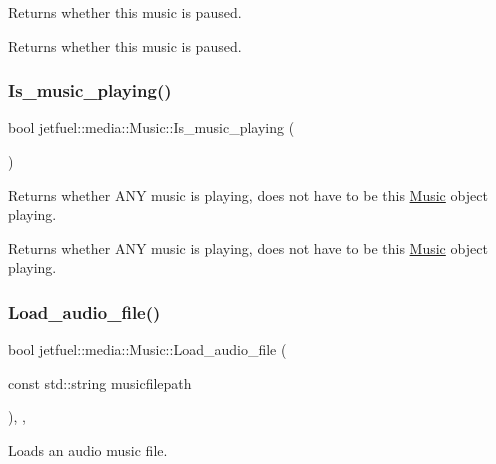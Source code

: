 Returns whether this music is paused. 

Returns whether this music is paused. \mbox{\label{classjetfuel_1_1media_1_1Music_ad19f7983782f39f70e354796c2ba0bd1}} 
\subsubsection{\texorpdfstring{Is\+\_\+music\+\_\+playing()}{Is\_music\_playing()}}
{\footnotesize\ttfamily bool jetfuel\+::media\+::\+Music\+::\+Is\+\_\+music\+\_\+playing (\begin{DoxyParamCaption}{ }\end{DoxyParamCaption})\hspace{0.3cm}{\ttfamily [inline]}}



Returns whether A\+NY music is playing, does not have to be this \hyperlink{classjetfuel_1_1media_1_1Music}{Music} object playing. 

Returns whether A\+NY music is playing, does not have to be this \hyperlink{classjetfuel_1_1media_1_1Music}{Music} object playing. \mbox{\label{classjetfuel_1_1media_1_1Music_ae24079b0301f5cf845d094e32ed22da1}} 
\subsubsection{\texorpdfstring{Load\+\_\+audio\+\_\+file()}{Load\_audio\_file()}}
{\footnotesize\ttfamily bool jetfuel\+::media\+::\+Music\+::\+Load\+\_\+audio\+\_\+file (\begin{DoxyParamCaption}\item[{const std\+::string}]{musicfilepath }\end{DoxyParamCaption})\hspace{0.3cm}{\ttfamily [inline]}, {\ttfamily [override]}, {\ttfamily [virtual]}}



Loads an audio music file. 

